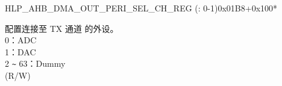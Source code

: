\begin{register}{H}{LP\_AHB\_DMA\_OUT\_PERI\_SEL\_CH\_REG (: 0-1)}{0x01B8+0x100*}\label{regdesc:LPAHBDMAOUTPERISELCHNREG}
%
%
\regnewline%
\begin{regdesc}\begin{reglist}
\label{fielddesc:LPAHBDMAPERIOUTSELCHN}\item [LP\_AHB\_DMA\_PERI\_OUT\_SEL\_CH\regindex{n}] 配置连接至 TX 通道  的外设。\\ 0：ADC\\ 1：DAC\\ 2 \verb+~+ 63：Dummy \\ (R/W)
\end{reglist}\end{regdesc}
\end{register}
